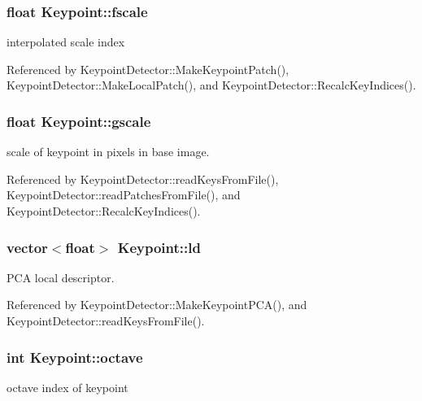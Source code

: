 \subsubsection[{fscale}]{\setlength{\rightskip}{0pt plus 5cm}float Keypoint\+::fscale}\label{classKeypoint_a187c6451e48ac1ffdfafa25f170d985d}


interpolated scale index 



Referenced by Keypoint\+Detector\+::\+Make\+Keypoint\+Patch(), Keypoint\+Detector\+::\+Make\+Local\+Patch(), and Keypoint\+Detector\+::\+Recalc\+Key\+Indices().

\subsubsection[{gscale}]{\setlength{\rightskip}{0pt plus 5cm}float Keypoint\+::gscale}\label{classKeypoint_a1fa3ed838f4b05b688185386fe309d66}


scale of keypoint in pixels in base image. 



Referenced by Keypoint\+Detector\+::read\+Keys\+From\+File(), Keypoint\+Detector\+::read\+Patches\+From\+File(), and Keypoint\+Detector\+::\+Recalc\+Key\+Indices().

\subsubsection[{ld}]{\setlength{\rightskip}{0pt plus 5cm}vector$<$float$>$ Keypoint\+::ld}\label{classKeypoint_ab0ba078d640458b8a75ee16ac57f4d6f}


P\+CA local descriptor. 



Referenced by Keypoint\+Detector\+::\+Make\+Keypoint\+P\+C\+A(), and Keypoint\+Detector\+::read\+Keys\+From\+File().

\subsubsection[{octave}]{\setlength{\rightskip}{0pt plus 5cm}int Keypoint\+::octave}\label{classKeypoint_a428aed23a97a21bbd8342f8acf39cf07}


octave index of keypoint 




